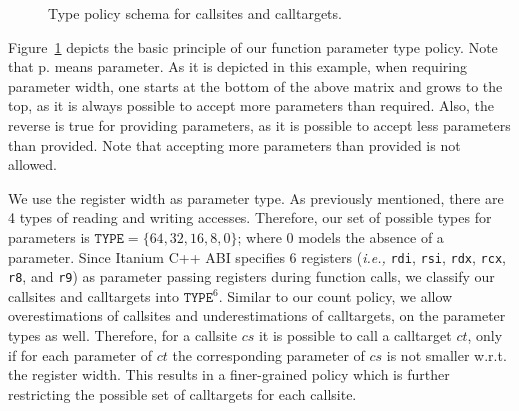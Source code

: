 \begin{figure}[h!]
{
}
\caption{Type policy schema for callsites and calltargets.}
\label{fig:TYPEschema}
\vspace{-.5cm}
\end{figure}

Figure~\ref{fig:TYPEschema} depicts the basic principle of our function parameter type policy.
Note that p. means parameter. As it is depicted in this example, when requiring parameter width, one starts at the 
bottom of the above matrix and grows to the top, as it is always possible to accept more parameters than required.
Also, the reverse is true for providing parameters, as it is possible to accept less parameters than provided.
Note that accepting more parameters than provided is not allowed.

We use the register width as parameter type. As previously mentioned, there are 4 types 
of reading and writing accesses. Therefore, our set of possible types for parameters is $\texttt{TYPE} = \{64, 32, 16, 8, 0\}$; where 0 models the absence of a 
parameter. Since Itanium C++ ABI specifies 6 registers (\textit{i.e.,} \texttt{rdi}, \texttt{rsi}, \texttt{rdx}, \texttt{rcx}, \texttt{r8}, and \texttt{r9}) as 
parameter passing registers during function calls, we classify our callsites and calltargets into $\texttt{TYPE}^6$. Similar to
our count policy, we allow overestimations of callsites and underestimations of calltargets, on the parameter types as well. Therefore, for a 
callsite $cs$ it is possible to call a calltarget $ct$, only if for each parameter of $ct$ the corresponding parameter of $cs$ is not smaller w.r.t. the register width.
This results in a finer-grained policy which is further restricting the possible set of calltargets for each callsite.


